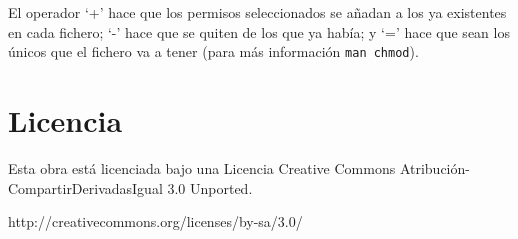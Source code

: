 \documentclass[12pt]{article}
\begin{document}
 El operador `+' hace que los permisos seleccionados se añadan a los ya
       existentes en cada fichero; `-' hace que  se  quiten  de  los  que  ya
       había; y `=' hace que sean los únicos que el fichero va a tener
(para más información {\tt man chmod}).



\section*{Licencia}
Esta obra está licenciada bajo una Licencia Creative Commons Atribución-CompartirDerivadasIgual 3.0 Unported. 

http://creativecommons.org/licenses/by-sa/3.0/
\end{document}
